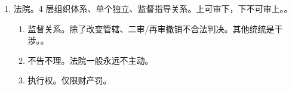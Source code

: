 \begin{enumerate}
\begin{enumerate}
\begin{enumerate}
                        。
                  \item 职权范围。立案、侦查权、公诉权、法律监督权（唯一）。
                  \item 先这么记吧。除了抗诉不当要先听意见，其他都是可以、直接、能够、决定。
                \end{enumerate}
          \item 法院。4 层组织体系、单个独立、监督指导关系。上可审下，下不可审上。。
                \begin{enumerate}
                  \item 监督关系。除了改变管辖、二审/再审撤销不合法判决。其他统统是干涉。。
                  \item 不告不理。法院一般永远不主动。
                  \item 执行权。仅限财产罚。
                \end{enumerate}
        \end{enumerate}
\end{enumerate}

